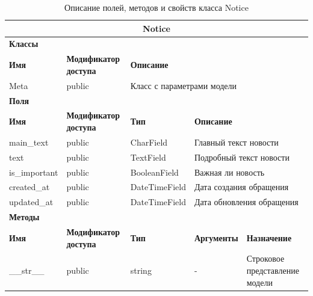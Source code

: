 \documentclass{../includes/TechDoc}
\begin{document}
    \begin{table}[ht]
        \caption{\label{tab:class-Notice-table}Описание полей, методов и свойств класса Notice}
        \centering
        \begin{tabular}{|p{3.2cm}|p{3cm}|p{2.9cm}|p{2.9cm}|p{4cm}|}
            \hline
            \multicolumn{5}{|c|}{Notice} \\ \hline
            \multicolumn{5}{|l|}{\textbf{Классы}} \\ \hline
            \textbf{Имя} & \textbf{Модификатор доступа} & \multicolumn{3}{p{9.8cm}|}{\textbf{Описание}} \\ \hline
            Meta & public & \multicolumn{3}{p{9.8cm}|}{Класс с параметрами модели} \\ \hline
            \multicolumn{5}{|l|}{\textbf{Поля}} \\ \hline
            \textbf{Имя} & \textbf{Модификатор доступа} & \textbf{Тип} & \multicolumn{2}{p{6.9cm}|}{\textbf{Описание}} \\ \hline
            main\_text & public & CharField & \multicolumn{2}{p{6.9cm}|}{Главный текст новости} \\ \hline
            text & public & TextField & \multicolumn{2}{p{6.9cm}|}{Подробный текст новости} \\ \hline
            is\_important & public & BooleanField & \multicolumn{2}{p{6.9cm}|}{Важная ли новость} \\ \hline
            created\_at & public & DateTimeField & \multicolumn{2}{p{6.9cm}|}{Дата создания обращения} \\ \hline
            updated\_at & public & DateTimeField & \multicolumn{2}{p{6.9cm}|}{Дата обновления обращения} \\ \hline
            \multicolumn{5}{|l|}{\textbf{Методы}} \\ \hline
            \textbf{Имя} & \textbf{Модификатор доступа} & \textbf{Тип} & \textbf{Аргументы} & \textbf{Назначение} \\ \hline
            \_\_str\_\_ & public & string & - & Строковое представление модели \\ \hline
        \end{tabular}
    \end{table}
\end{document}
